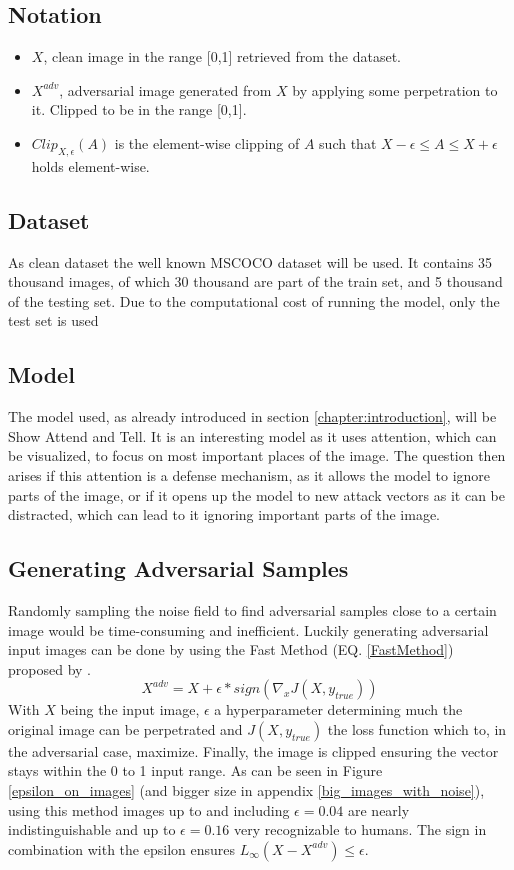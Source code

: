 \subsection{Notation}
\begin{itemize}
    \item $X$, clean image in the range [0,1] retrieved from the dataset.
    \item $X^{adv}$, adversarial image generated from $X$ by applying some perpetration to it. Clipped to be in the range [0,1].
    \item $Clip_{X,\epsilon}(A)$ is the element-wise clipping of $A$ such that $X -\epsilon \leq A \leq X + \epsilon$ holds element-wise.
\end{itemize}

\subsection{Dataset}
As clean dataset the well known MSCOCO \cite{lin2015microsoft} dataset will be used. It contains 35 thousand images, of which 30 thousand are part of the train set, and 5 thousand of the testing set. Due to the computational cost of running the model, only the test set is used

\subsection{Model}
The model used, as already introduced in section \ref{chapter:introduction}, will be Show Attend and Tell. It is an interesting model as it uses attention, which can be visualized, to focus on most important places of the image. The question then arises if this attention is a defense mechanism, as it allows the model to ignore parts of the image, or if it opens up the model to new attack vectors as it can be distracted, which can lead to it ignoring important parts of the image.

\subsection{Generating Adversarial Samples}
Randomly sampling the noise field to find adversarial samples close to a certain image would be time-consuming and inefficient. Luckily generating adversarial input images can be done by using the Fast Method (EQ. \ref{FastMethod}) proposed by \citeauthor{goodfellow2015explaining}.
\begin{equation}
    X^{adv} = X + \epsilon * sign(\nabla_{x}J(X, y_{true}))
    \label{FastMethod}
\end{equation}
With $X$ being the input image, $\epsilon$ a hyperparameter determining much the original image can be perpetrated and $J(X, y_{true})$ the loss function which to, in the adversarial case, maximize. Finally, the image is clipped ensuring the vector stays within the 0 to 1 input range. As can be seen in Figure \ref{epsilon_on_images} (and bigger size in appendix \ref{big_images_with_noise}), using this method images up to and including $\epsilon=0.04$ are nearly indistinguishable and up to $\epsilon=0.16$ very recognizable to humans. The sign in combination with the epsilon ensures $L_{\infty}(X - X^{adv}) \leq \epsilon$.

